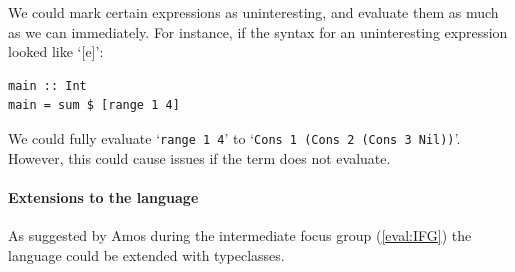 We could mark certain expressions as uninteresting, and evaluate them as much as we can immediately. For instance, if the syntax for an uninteresting expression looked like `[e]':

\begin{lstlisting}[language=SFL]
main :: Int 
main = sum $ [range 1 4]
\end{lstlisting}

\noindent We could fully evaluate `\lstinline[language=SFL]|range 1 4|' to `\lstinline[language=SFL]|Cons 1 (Cons 2 (Cons 3 Nil))|'. However, this could cause issues if the term does not evaluate. 







\paragraph{Extensions to the language}
As suggested by Amos during the intermediate focus group (\ref{eval:IFG}) the language could be extended with typeclasses. 
